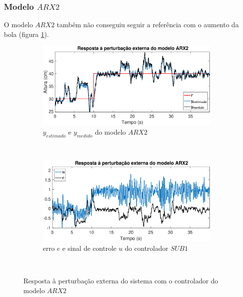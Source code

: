 \subsubsection{Modelo $ARX2$}
O modelo $ARX2$ também não conseguiu seguir a referência com o aumento da bola (figura \ref{fig:pextrarx2y}).
\begin{figure}[htb]
	\centering
	\begin{subfigure}[t]{0.48\textwidth}
		\includegraphics[width=1\linewidth]{pextrarx2y}
		\caption[$y_{estimado}$ e $y_{medido}$ do modelo $ARX2$]{$y_{estimado}$ e $y_{medido}$ do modelo $ARX2$}
		\label{fig:pextrarx2y}
	\end{subfigure}
	~ %
	\begin{subfigure}[t]{0.48\textwidth}
		\includegraphics[width=1\linewidth]{pextrarx2e}
		\caption[erro $e$ e sinal de controle $u$ do controlador $SUB1$]{erro $e$ e sinal de controle $u$ do controlador $SUB1$}
		\label{fig:pextrarx2e}
	\end{subfigure}
	~ %
	
	\caption{Resposta à perturbação externa do sistema com o controlador do modelo $ARX2$}\label{fig:pextrarx2}
\end{figure}

